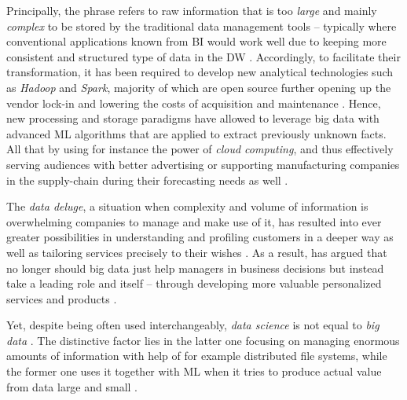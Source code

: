 Principally, the phrase refers to raw information that is too \emph{large} and mainly \emph{complex} to be stored by the traditional data management tools  -- typically where conventional applications known from \ac{BI} would work well due to keeping more consistent and structured type of data in the \ac{DW} \parencites{CaoLong2017}{Provost201351}[173]{ChenMinMao2014}.
Accordingly, to facilitate their transformation, it has been required to develop new analytical technologies such as \emph{Hadoop} and \emph{Spark}, majority of which are open source further opening up the vendor lock-in and lowering the costs of acquisition and maintenance \parencites{Provost201351}{mcafee2012big}{MauroGreco2015}. 
Hence, new processing and storage paradigms have allowed to leverage big data with advanced \ac{ML} algorithms that are applied to extract previously unknown facts. 
All that by using for instance the power of \emph{cloud computing}, and thus effectively serving audiences with better advertising or supporting manufacturing companies in the supply-chain during their forecasting needs as well \parencite{JBL:JBL12010}.

The \emph{data deluge}, a situation when complexity and volume of information is overwhelming companies to manage and make use of it, has resulted into ever greater possibilities in understanding and profiling customers in a deeper way as well as tailoring services precisely to their wishes \parencites{LongCao2016}{ChenMinMao2014}.
As a result, \textcite{Davenport2013Analytics3.0} has argued that no longer should big data just help managers in business decisions but instead take a leading role and  itself -- through developing more valuable personalized services and products \parencite[704]{Larson2016AScience}.

Yet, despite being often used interchangeably, \emph{data science} is not equal to \emph{big data} \parencite{Fern2016}.
The distinctive factor lies in the latter one focusing on managing enormous amounts of information with help of for example distributed file systems, while the former one uses it together with \ac{ML} when it tries to produce actual value from data large and small \parencite{Sean2015}. 

